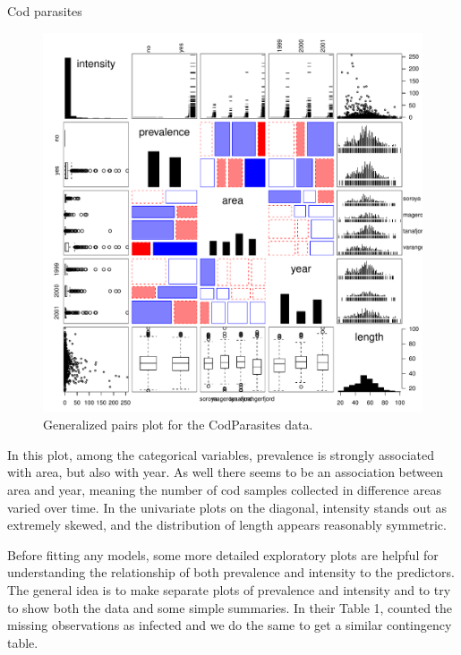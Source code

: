 \documentclass[11pt]{book}\usepackage[]{graphicx}\usepackage[]{color}
\newenvironment{knitrout}{}{} %
\renewenvironment{knitrout}{\small\renewcommand{\baselinestretch}{.85}}{} %
\begin{document}
\begin{Example}[cod1]{Cod parasites}
\begin{knitrout}
\begin{figure}[htb!]
\centerline{\includegraphics[width=.8\textwidth]{ch09/fig/cod1-gpairs} }

\caption[Generalized pairs plot for the CodParasites data]{Generalized pairs plot for the CodParasites data.\label{fig:cod1-gpairs}}
\end{figure}


\end{knitrout}
In this plot, among the categorical variables, prevalence is strongly associated with area, but also with year.
As well there seems to be an association between area and year, meaning the number of cod samples
collected in difference areas varied over time. In the univariate plots on the diagonal, intensity
stands out as extremely skewed, and the distribution of length appears reasonably symmetric.

Before fitting any models, some more detailed
exploratory plots are helpful for understanding the relationship
of both prevalence and intensity to the predictors.  The general idea is to make separate
plots of prevalence and intensity and to try to show both the data and some simple summaries.
In their Table 1, \citet{Hemmingsen-etal:2005}
counted the missing observations as infected and we do the same to get a similar contingency table.


\end{Example}
\end{document}
